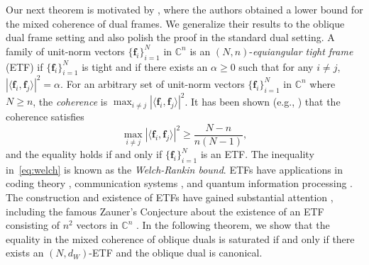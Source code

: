 \documentclass{amsart}
\numberwithin{equation}{section}
\newcommand{\bof}{{\mathbf f}}
\newcommand{\absip}[2]{\left\vert\langle#1,#2\rangle\right\vert}
\theoremstyle{plain}
\theoremstyle{remark}
\theoremstyle{definition}
\begin{document}
Our next theorem is motivated by \cite[Theorem 2.3 and Proposition 2.4]{christensen2020equiangular}, where the authors obtained a lower bound for the mixed coherence of dual frames. We generalize their results to the oblique dual frame setting and also polish the proof in the standard dual setting.
A family of unit-norm vectors $\{\mathbf{f}_i\}_{i=1}^N$ in $\mathbb{C}^n$ 
is an $(N,n)$-\emph{equiangular tight frame} (ETF) if $\{\mathbf{f}_i\}_{i=1}^N$ is tight and if there exists an $\alpha \ge 0$ such that for any $i \neq j$, $\absip{\bof_i}{\bof_j}^2=\alpha$.
For an arbitrary set of unit-norm vectors $\{\mathbf{f}_i\}_{i=1}^N$ in $\mathbb{C}^n$ where $N \geq n$, the \emph{coherence} is $\max_{i \neq j} |\langle \mathbf{f}_i, \mathbf{f}_j \rangle|^2$.  It has been shown (e.g., \cite{welch1974lower}) that the coherence satisfies
\begin{equation}\label{eq:welch}
    \max_{i \neq j} |\langle \mathbf{f}_i, \mathbf{f}_j \rangle|^2 
    \geq \frac{N-n}{n(N-1)},
\end{equation}
and the equality holds if and only if $\{\mathbf{f}_i\}_{i=1}^N$ is an ETF. The inequality in~\eqref{eq:welch} is known as the \emph{Welch-Rankin bound}.
ETFs have applications in coding theory \cite{massey1991welch}, communication systems \cite{strohmer2003grassmannian}, and quantum information processing \cite{zauner1999grundzuge, renes2004symmetric}. 
The construction and existence of ETFs have gained substantial attention \cite{sustik2007existence, holmes2004optimal,  bodmann2009equiangular, appleby2025constructive}, including the famous Zauner's Conjecture about the existence of an ETF consisting of $n^2$ vectors in $\mathbb{C}^n$ \cite{zauner1999grundzuge, appleby2025constructive}. In the following theorem, we show that the equality in the mixed coherence of oblique duals is saturated if and only if there exists an $(N, d_W)$-ETF and the oblique dual is canonical. 
\end{document}
